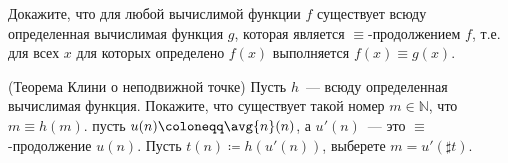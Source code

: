 \begin{enumcyr}
    \item Докажите, что для любой вычислимой функции $f$ существует всюду определенная вычислимая функция
        $g$, которая является $\equiv$-продолжением $f$, т.е. для всех $x$ для которых определено $f(x)$
        выполняется $f(x) \equiv g(x)$.
    \item (Теорема Клини о неподвижной точке) Пусть $h$~--- всюду определенная вычислимая
        функция. Покажите, что существует такой номер $m \in \mathbb{N}$, что $m \equiv h(m)$.
         пусть $u(n) \coloneqq \avg{n}(n)$, а $u'(n)$~--- это $\equiv$-продолжение
        $u(n)$. Пусть $t(n) \coloneqq h(u'(n))$, выберете $m = u'(\sharp t)$.
\end{enumcyr}